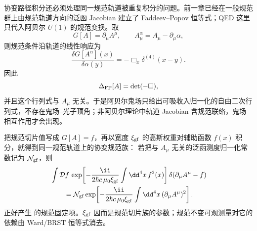 协变路径积分还必须处理同一规范轨道被重复积分的问题。前一章已经在一般规范群上由规范轨道方向的泛函 Jacobian 建立了 Faddeev--Popov 恒等式；QED 这里只代入阿贝尔 $U(1)$ 的规范变换。取
\begin{equation*}
 G[A]=\partial_\mu A^\mu,
 \qquad
 A_\mu^\alpha=A_\mu-\partial_\mu\alpha,
\end{equation*}
则规范条件沿轨道的线性响应为
\begin{equation*}
 \frac{\delta G[A^\alpha](x)}{\delta\alpha(y)}
 =-\Box_x\delta^{(4)}(x-y).
\end{equation*}
因此
\begin{equation}
 {
 \Delta_{\rm FP}[A]=\det(-\Box),}
 \label{eq:FP-QED-det-r8}
\end{equation}
并且这个行列式与 $A_\mu$ 无关。于是阿贝尔鬼场只给出可吸收入归一化的自由二次行列式，不存在鬼场--光子顶角；非阿贝尔理论中轨道 Jacobian 含规范联络，鬼场相互作用才会出现。

把规范切片值写成 $G[A]=f$，再以宽度 $\xi_{\rm gf}$ 的高斯权重对辅助函数 $f(x)$ 积分，就得到同一规范轨道上的协变规范族：
若把与 $A_\mu$ 无关的泛函测度归一化常数记为 $\mathcal N_{\rm gf}$，则
\begin{equation}
 {
 \begin{aligned}
 &\int\mathcal Df\,
 \exp\!\left[-\frac{\ii}{2\hbar c\,\mu_0\xi_{\rm gf}}
 \int\dd^4 x\,f^2(x)\right]
 \delta\!\left(\partial_\mu A^\mu-f\right)\\
 &\qquad=
 \mathcal N_{\rm gf}
 \exp\!\left[-\frac{\ii}{2\hbar c\,\mu_0\xi_{\rm gf}}
 \int\dd^4 x\,(\partial_\mu A^\mu)^2\right].
 \end{aligned}}
 \label{eq:FP-gaussian-average-r8}
\end{equation}
 正好产生 的规范固定项。$\xi_{\rm gf}$ 因而是规范切片族的参数；规范不变可观测量对它的依赖由 Ward/BRST 恒等式消去。






